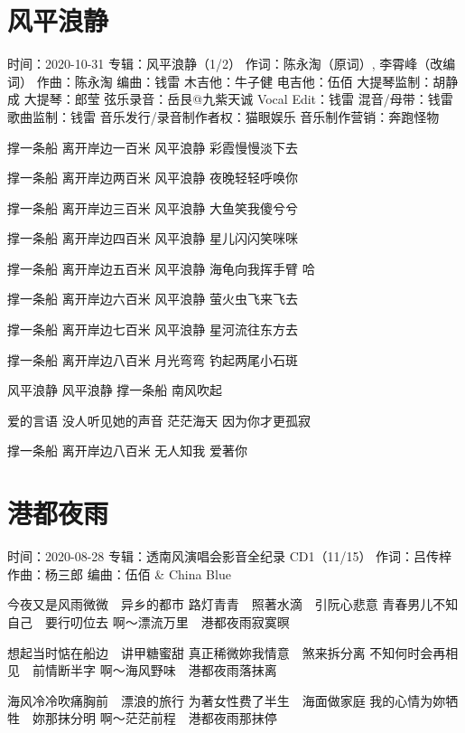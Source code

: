 \documentclass[UTF8,a4paper,oneside,twocolumn,12pt]{ctexbook}
\newcommand{\infopair}[2]{\textbullet #1：#2}
\newcommand{\zc}[1][伍佰]{\infopair{作词}{#1}}
\newcommand{\zq}[1][伍佰]{\infopair{作曲}{#1}}
\newcommand{\bq}[1][伍佰]{\infopair{编曲}{#1}}
\newcommand{\zj}[1]{\infopair{专辑}{#1}}
\newcommand{\sj}[1]{\infopair{时间}{#1}}
\newenvironment{info}{\begin{flushleft}\kaishu
	}
	{\end{flushleft}\normalsize\yahei\par}
\newenvironment{lyric}{
	}
{}
\begin{document}
\section{风平浪静}
\begin{info}
	\sj{2020-10-31}
	\zj{风平浪静（1/2）}
	\zc[陈永淘（原词）, 李霄峰（改编词）]
	\zq[陈永淘]
	\bq[钱雷]
	\infopair{木吉他}{牛子健}
	\infopair{电吉他}{伍佰}
	\infopair{大提琴监制}{胡静成}
	\infopair{大提琴}{郎莹}
	\infopair{弦乐录音}{岳艮@九紫天诚}
	\infopair{Vocal Edit}{钱雷}
	\infopair{混音/母带}{钱雷}
	\infopair{歌曲监制}{钱雷}
	\infopair{音乐发行/录音制作者权}{猫眼娱乐}
	\infopair{音乐制作营销}{奔跑怪物}
\end{info}
\begin{lyric}
	撑一条船 离开岸边一百米
	风平浪静 彩霞慢慢淡下去

	撑一条船 离开岸边两百米
	风平浪静 夜晚轻轻呼唤你

	撑一条船 离开岸边三百米
	风平浪静 大鱼笑我傻兮兮

	撑一条船 离开岸边四百米
	风平浪静 星儿闪闪笑咪咪

	撑一条船 离开岸边五百米
	风平浪静 海龟向我挥手臂 哈

	撑一条船 离开岸边六百米
	风平浪静 萤火虫飞来飞去

	撑一条船 离开岸边七百米
	风平浪静 星河流往东方去

	撑一条船 离开岸边八百米
	月光弯弯 钓起两尾小石斑

	风平浪静 风平浪静
	撑一条船 南风吹起

	爱的言语 没人听见她的声音
	茫茫海天 因为你才更孤寂

	撑一条船 离开岸边八百米
	无人知我 爱著你
\end{lyric}

\section{港都夜雨}
\begin{info}
	\sj{2020-08-28}
	\zj{透南风演唱会影音全纪录 CD1（11/15）}
	\zc[吕传梓]
	\zq[杨三郎]
	\bq[伍佰 \& China Blue]
\end{info}
\begin{lyric}
	今夜又是风雨微微　异乡的都市
	路灯青青　照著水滴　引阮心悲意
	青春男儿不知自己　要行叨位去
	啊～漂流万里　港都夜雨寂寞暝

	想起当时惦在船边　讲甲糖蜜甜
	真正稀微妳我情意　煞来拆分离
	不知何时会再相见　前情断半字
	啊～海风野味　港都夜雨落抹离

	海风冷冷吹痛胸前　漂浪的旅行
	为著女性费了半生　海面做家庭
	我的心情为妳牺牲　妳那抹分明
	啊～茫茫前程　港都夜雨那抹停
\end{lyric}
\end{document}
